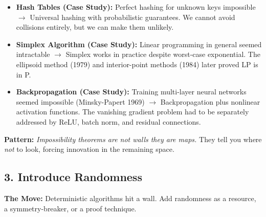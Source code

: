 \begin{itemize}
\item \textbf{Hash Tables (Case Study):} Perfect hashing for unknown keys impossible $\to$ Universal hashing with probabilistic guarantees. We cannot avoid collisions entirely, but we can make them unlikely.

\item \textbf{Simplex Algorithm (Case Study):} Linear programming in general seemed intractable $\to$ Simplex works in practice despite worst-case exponential. The ellipsoid method (1979) and interior-point methods (1984) later proved LP is in P.

\item \textbf{Backpropagation (Case Study):} Training multi-layer neural networks seemed impossible (Minsky-Papert 1969) $\to$ Backpropagation plus nonlinear activation functions. The vanishing gradient problem had to be separately addressed by ReLU, batch norm, and residual connections.
\end{itemize}

\textbf{Pattern:} \emph{Impossibility theorems are not walls they are maps.} They tell you where \emph{not} to look, forcing innovation in the remaining space.
\subsection{3. Introduce Randomness}
\label{sec:anatomy:randomness}

\textbf{The Move:} Deterministic algorithms hit a wall. Add randomness as a resource, a symmetry-breaker, or a proof technique.

